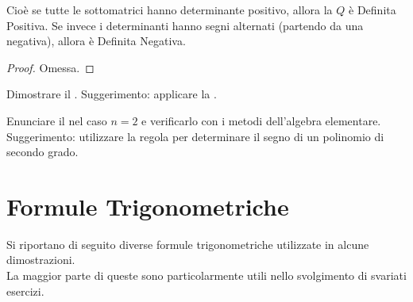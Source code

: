 \begin{appendices}
\begin{corollary}
	Cioè se tutte le sottomatrici hanno determinante positivo, allora la $Q$ è Definita Positiva. Se invece i determinanti hanno segni alternati
	(partendo da una negativa), allora è Definita Negativa.
	\begin{proof}
		Omessa.
	\end{proof}
\end{corollary}
\begin{exercise}
	Dimostrare il . Suggerimento: applicare la .
\end{exercise}
\begin{exercise}
	Enunciare il  nel caso $n = 2$ e verificarlo con i metodi dell'algebra elementare.\\
	Suggerimento: utilizzare la regola per determinare il segno di un polinomio di secondo grado.
\end{exercise}
\end{appendices}

\newpage
\section{Formule Trigonometriche}\label{sect:for_trigo}
Si riportano di seguito diverse formule trigonometriche utilizzate in alcune dimostrazioni.\\
La maggior parte di queste sono particolarmente utili nello svolgimento di svariati esercizi.

